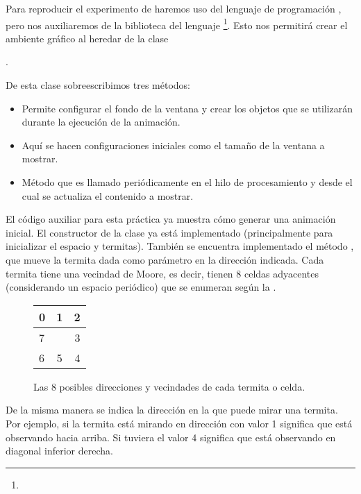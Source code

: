 Para reproducir el experimento de \cite{Resnick1994} haremos uso del lenguaje de programación \Java, pero nos auxiliaremos de la biblioteca  del lenguaje \footnote{}.  Esto nos permitirá crear el ambiente gráfico al heredar de la clase
\begin{center}
 .
\end{center}
De esta clase sobreescribimos tres métodos:
\begin{itemize}
 \item {} Permite configurar el fondo de la ventana y crear los objetos que se utilizarán durante la ejecución de la animación.

 \item {} Aquí se hacen configuraciones iniciales como el tamaño de la ventana a mostrar.

 \item {} Método que es llamado periódicamente en el hilo de procesamiento y desde el cual se actualiza el contenido a mostrar.
\end{itemize}

El código auxiliar para esta práctica ya muestra cómo generar una animación inicial.  El constructor de la clase  ya está implementado (principalmente para inicializar el espacio y termitas). También se encuentra implementado el método , que mueve la termita dada como parámetro en la dirección indicada. Cada termita tiene una vecindad de Moore, es decir, tienen 8 celdas adyacentes (considerando un espacio periódico) que se enumeran según la .

\begin{figure}
  \begin{center}
    \begin{tabular}{| l | c | r |}
      \hline
      0 & 1 & 2 \\ \hline
      7 &   & 3 \\ \hline
      6 & 5 & 4 \\
      \hline
    \end{tabular}
  \end{center}
  \caption{Las 8 posibles direcciones y vecindades de cada termita o celda.}
  \label{fig:dirsposibles1}
\end{figure}

De la misma manera se indica la dirección en la que puede mirar una termita. Por ejemplo, si la termita está mirando en dirección con valor 1 significa que está observando hacia arriba. Si tuviera el valor 4 significa que está observando en diagonal inferior derecha.

